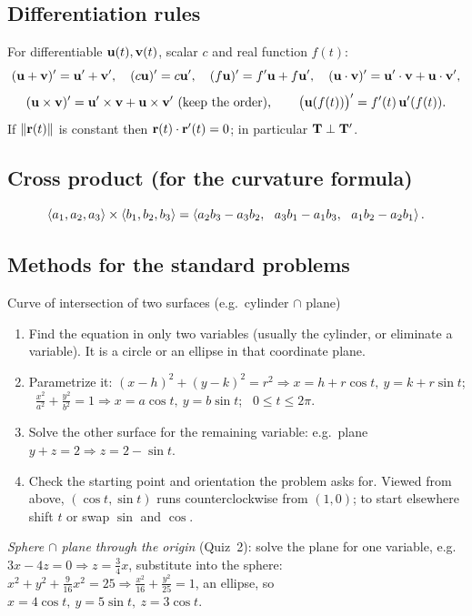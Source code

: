 \subsection*{Differentiation rules}
For differentiable $\mathbf{u}(t),\mathbf{v}(t)$, scalar $c$ and real function $f(t)$:
\[
(\mathbf{u}+\mathbf{v})'=\mathbf{u}'+\mathbf{v}',\quad (c\mathbf{u})'=c\mathbf{u}',\quad (f\mathbf{u})'=f'\mathbf{u}+f\mathbf{u}',\quad
(\mathbf{u}\cdot\mathbf{v})'=\mathbf{u}'\cdot\mathbf{v}+\mathbf{u}\cdot\mathbf{v}',
\]
\[
(\vu\times\vv)'=\vu'\times\vv+\vu\times\vv' \ (\text{keep the order}),\qquad
\bigl(\vu(f(t))\bigr)'=f'(t)\,\vu'(f(t)).
\]
If $\lVert\mathbf{r}(t)\rVert$ is constant then $\mathbf{r}(t)\cdot\mathbf{r}'(t)=0$; in particular $\mathbf{T}\perp\mathbf{T}'$.

\subsection*{Cross product (for the curvature formula)}
\[
\left\langle a_1,a_2,a_3 \right\rangle\times\left\langle b_1,b_2,b_3 \right\rangle
=\left\langle a_2b_3-a_3b_2,\ \ a_3b_1-a_1b_3,\ \ a_1b_2-a_2b_1 \right\rangle.
\]

\subsection*{Methods for the standard problems}

\begin{strategy}{Curve of intersection of two surfaces (e.g.\ cylinder $\cap$ plane)}
\begin{enumerate}
\item Find the equation in only two variables (usually the cylinder, or eliminate a variable).
  It is a circle or an ellipse in that coordinate plane.
\item Parametrize it: $(x-h)^2+(y-k)^2=r^2\Rightarrow x=h+r\cos t,\ y=k+r\sin t$;
  \ $\frac{x^2}{a^2}+\frac{y^2}{b^2}=1\Rightarrow x=a\cos t,\ y=b\sin t$; \ $0\le t\le 2\pi$.
\item Solve the other surface for the remaining variable: e.g.\ plane $y+z=2\Rightarrow z=2-\sin t$.
\item Check the starting point and orientation the problem asks for. Viewed from above,
  $(\cos t,\sin t)$ runs counterclockwise from $(1,0)$; to start elsewhere shift $t$ or swap
  $\sin$ and $\cos$.
\end{enumerate}
\emph{Sphere $\cap$ plane through the origin} (Quiz~2): solve the plane for one variable, e.g.\
$3x-4z=0\Rightarrow z=\tfrac34x$, substitute into the sphere: $x^2+y^2+\tfrac9{16}x^2=25\Rightarrow
\frac{x^2}{16}+\frac{y^2}{25}=1$, an ellipse, so $x=4\cos t,\ y=5\sin t,\ z=3\cos t$.
\end{strategy}

